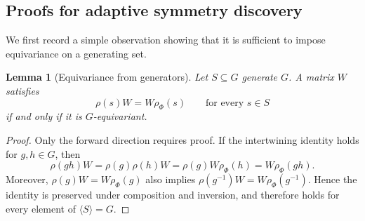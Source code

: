 \documentclass[11pt]{article}
\theoremstyle{plain}
\newtheorem{lemma}[theorem]{Lemma}
\theoremstyle{definition}
\theoremstyle{remark}
\begin{document}

 
\subsection{Proofs for adaptive symmetry discovery}
\label{app:adaptive}

We first record a simple observation showing that it is sufficient to impose
equivariance on a generating set.

\begin{lemma}[Equivariance from generators]
\label{lem:equivariance_generators}
Let \(S\subseteq G\) generate \(G\). A matrix \(W\) satisfies
\[
\rho(s)W=W\rho_\Phi(s)
\qquad
\text{for every }s\in S
\]
if and only if it is \(G\)-equivariant.
\end{lemma}

\begin{proof}
Only the forward direction requires proof. If the intertwining identity holds
for \(g,h\in G\), then
\[
\rho(gh)W
=\rho(g)\rho(h)W
=\rho(g)W\rho_\Phi(h)
=W\rho_\Phi(gh).
\]
Moreover, \(\rho(g)W=W\rho_\Phi(g)\) also implies
\(\rho(g^{-1})W=W\rho_\Phi(g^{-1})\). Hence the identity is preserved under
composition and inversion, and therefore holds for every element of
\(\langle S\rangle=G\).
\end{proof}
\end{document}
